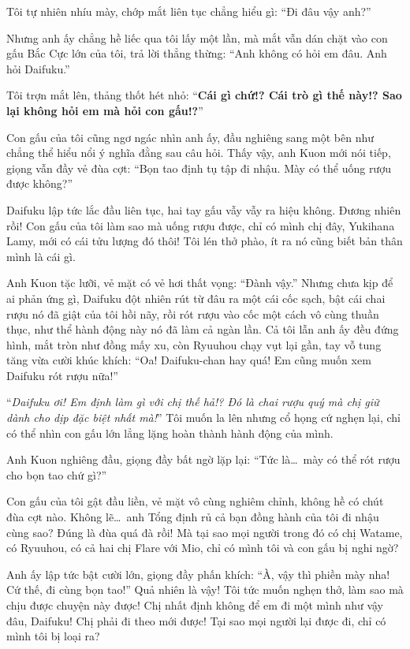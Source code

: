 \documentclass[../main.tex]{subfiles}
\begin{document}
Tôi tự nhiên nhíu mày, chớp mắt liên tục chẳng hiểu gì: ``Đi đâu vậy anh?''

Nhưng anh ấy chẳng hề liếc qua tôi lấy một lần, mà mắt vẫn dán chặt vào con gấu Bắc Cực lớn của tôi, trả lời thẳng thừng: ``Anh không có hỏi em đâu. Anh hỏi Daifuku.''

Tôi trợn mắt lên, thảng thốt hét nhỏ: ``\textbf{Cái gì chứ!? Cái trò gì thế này!? Sao lại không hỏi em mà hỏi con gấu!?}''

Con gấu của tôi cũng ngơ ngác nhìn anh ấy, đầu nghiêng sang một bên như chẳng thể hiểu nổi ý nghĩa đằng sau câu hỏi. Thấy vậy, anh Kuon mới nói tiếp, giọng vẫn đầy vẻ đùa cợt: ``Bọn tao định tụ tập đi nhậu. Mày có thể uống rượu được không?''

Daifuku lập tức lắc đầu liên tục, hai tay gấu vẫy vẫy ra hiệu không. Đương nhiên rồi! Con gấu của tôi làm sao mà uống rượu được, chỉ có mình chị đây, Yukihana Lamy, mới có cái tửu lượng đó thôi! Tôi lén thở phào, ít ra nó cũng biết bản thân mình là cái gì.

Anh Kuon tặc lưỡi, vẻ mặt có vẻ hơi thất vọng: ``Đành vậy.'' Nhưng chưa kịp để ai phản ứng gì, Daifuku đột nhiên rút từ đâu ra một cái cốc sạch, bật cái chai rượu nó đã giật của tôi hồi nãy, rồi rót rượu vào cốc một cách vô cùng thuần thục, như thể hành động này nó đã làm cả ngàn lần. Cả tôi lẫn anh ấy đều đứng hình, mắt tròn như đồng mấy xu, còn Ryuuhou chạy vụt lại gần, tay vỗ tung tăng vừa cười khúc khích: ``Oa! Daifuku-chan hay quá! Em cũng muốn xem Daifuku rót rượu nữa!''

``\textit{Daifuku ơi! Em định làm gì với chị thế hả!? Đó là chai rượu quý mà chị giữ dành cho dịp đặc biệt nhất mà!}'' Tôi muốn la lên nhưng cổ họng cứ nghẹn lại, chỉ có thể nhìn con gấu lớn lẳng lặng hoàn thành hành động của mình.

Anh Kuon nghiêng đầu, giọng đầy bất ngờ lặp lại: ``Tức là\dots\ mày có thể rót rượu cho bọn tao chứ gì?''

Con gấu của tôi gật đầu liền, vẻ mặt vô cùng nghiêm chỉnh, không hề có chút đùa cợt nào. Không lẽ\dots\ anh Tổng định rủ cả bạn đồng hành của tôi đi nhậu cùng sao? Đúng là đùa quá đà rồi! Mà tại sao mọi người trong đó có chị Watame, có Ryuuhou, có cả hai chị Flare với Mio, chỉ có mình tôi và con gấu bị nghi ngờ?

Anh ấy lập tức bật cười lớn, giọng đầy phấn khích: ``À, vậy thì phiền mày nha! Cứ thế, đi cùng bọn tao!'' Quả nhiên là vậy! Tôi tức muốn nghẹn thở, làm sao mà chịu được chuyện này được! Chị nhất định không để em đi một mình như vậy đâu, Daifuku! Chị phải đi theo mới được! Tại sao mọi người lại được đi, chỉ có mình tôi bị loại ra?
\end{document}
